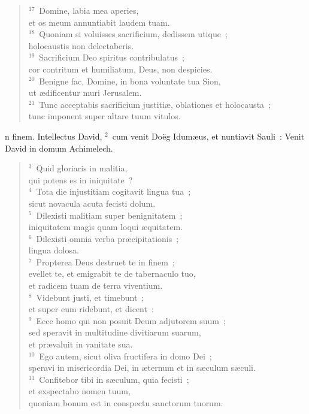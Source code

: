 \begin{flushleft}
\begin{verse}
${}^{17}$~Domine, labia mea aperies,\\ et os meum annuntiabit laudem tuam.\\
${}^{18}$~Quoniam si voluisses sacrificium, dedissem utique~;\\ holocaustis non delectaberis.\\
${}^{19}$~Sacrificium Deo spiritus contribulatus~;\\ cor contritum et humiliatum, Deus, non despicies.\\
${}^{20}$~Benigne fac, Domine, in bona voluntate tua Sion,\\ ut \ae dificentur muri Jerusalem.\\
${}^{21}$~Tunc acceptabis sacrificium justiti\ae , oblationes et holocausta~;\\ tunc imponent super altare tuum vitulos.\end{verse}\end{flushleft}



\bchapter
{}n finem. Intellectus David,
${}^{2}$~cum venit Do\"eg Idum\ae us, et nuntiavit Sauli~: Venit David in domum Achimelech.
\begin{flushleft}\begin{verse}${}^{3}$~Quid gloriaris in malitia,\\ qui potens es in iniquitate~?\\
${}^{4}$~Tota die injustitiam cogitavit lingua tua~;\\ sicut novacula acuta fecisti dolum.\\
${}^{5}$~Dilexisti malitiam super benignitatem~;\\ iniquitatem magis quam loqui \ae quitatem.\\
${}^{6}$~Dilexisti omnia verba pr\ae cipitationis~;\\ lingua dolosa.\\
${}^{7}$~Propterea Deus destruet te in finem~;\\ evellet te, et emigrabit te de tabernaculo tuo,\\ et radicem tuam de terra viventium.\\
${}^{8}$~Videbunt justi, et timebunt~;\\ et super eum ridebunt, et dicent~:\\
${}^{9}$~Ecce homo qui non posuit Deum adjutorem suum~;\\ sed speravit in multitudine divitiarum suarum,\\ et pr\ae valuit in vanitate sua.\\
${}^{10}$~Ego autem, sicut oliva fructifera in domo Dei~;\\ speravi in misericordia Dei, in \ae ternum et in s\ae culum s\ae culi.\\
${}^{11}$~Confitebor tibi in s\ae culum, quia fecisti~;\\ et exspectabo nomen tuum,\\ quoniam bonum est in conspectu sanctorum tuorum.\end{verse}\end{flushleft}




